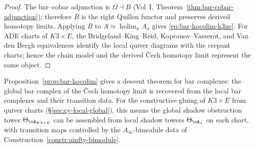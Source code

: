 \begin{proof}
The bar--cobar adjunction is
\(\Omega\dashv B\) (Vol~I, Theorem~\ref{thm:bar-cobar-adjunction});
therefore \(B\) is the right Quillen functor and preserves derived
homotopy limits. Applying \(B\) to
\(A\simeq\operatorname{holim}_{\sigma}A_\sigma\) gives
\eqref{eq:bar-hocolim-k3xe}.
For ADE charts of \(K3\times E\), the Bridgeland--King--Reid,
Kapranov--Vasserot, and Van den Bergh equivalences identify the local
quiver diagrams with the crepant charts; hence the chain model and
the derived \v{C}ech homotopy limit represent the same object.
\end{proof}

\begin{remark}
\label{rem:bar-descent}
Proposition~\ref{prop:bar-hocolim} gives a descent theorem for
bar complexes: the global bar complex of the \v{C}ech homotopy limit is
recovered from the local bar complexes and their transition data. For the
constructive gluing of $K3 \times E$ from quiver charts
(\S\ref{sec:cy-local-global}), this means the global shadow
obstruction tower $\Theta_{\cA_{K3 \times E}}$ can be assembled
from local shadow towers $\Theta_{\cA_\sigma}$ on each chart,
with transition maps controlled by the $A_\infty$-bimodule data
of Construction~\ref{constr:ainfty-bimodule}.
\end{remark}


